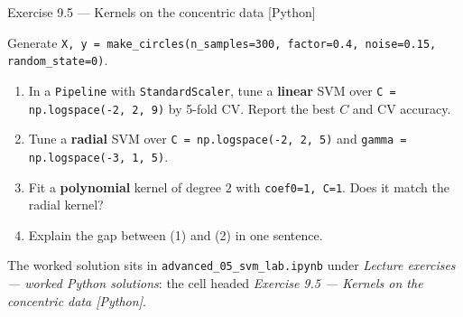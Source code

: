 \documentclass[aspectratio=169,11pt]{beamer}
\begin{document}
\begin{frame}{Exercise 9.5 --- Kernels on the concentric data [Python]}
\begin{exercise}
  Generate \texttt{X, y = make\_circles(n\_samples=300, factor=0.4,
  noise=0.15, random\_state=0)}.
  \begin{enumerate}
    \item In a \texttt{Pipeline} with \texttt{StandardScaler}, tune a
          \textbf{linear} SVM over \texttt{C = np.logspace(-2, 2, 9)} by
          5-fold CV. Report the best $C$ and CV accuracy.
    \item Tune a \textbf{radial} SVM over \texttt{C = np.logspace(-2, 2, 5)}
          and \texttt{gamma = np.logspace(-3, 1, 5)}.
    \item Fit a \textbf{polynomial} kernel of degree $2$ with
          \texttt{coef0=1, C=1}. Does it match the radial kernel?
    \item Explain the gap between (1) and (2) in one sentence.
  \end{enumerate}
\end{exercise}
\begin{labnote}
  The worked solution sits in \texttt{advanced\_05\_svm\_lab.ipynb} under
  \emph{Lecture exercises --- worked Python solutions}: the cell headed
  \emph{Exercise 9.5 --- Kernels on the concentric data [Python]}.
\end{labnote}
\end{frame}
\end{document}
